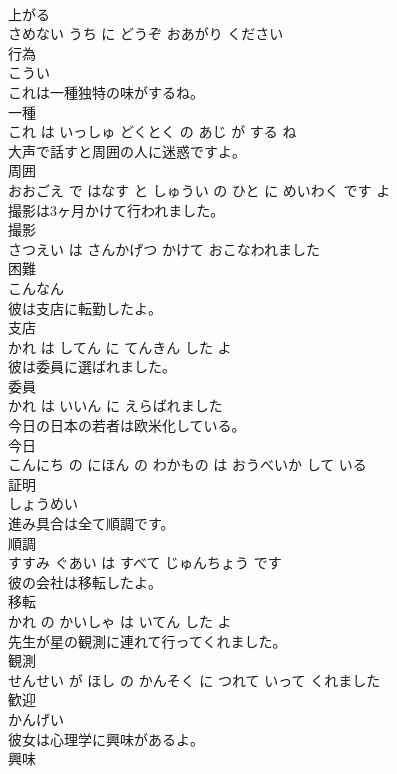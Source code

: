 \documentclass[8pt]{extreport}
\begin{document}
\begin{CJK}{UTF8}{min}
\\	上がる 
\\	さめない うち に どうぞ おあがり ください			
\\	行為	
\\	こうい			
\\	これは一種独特の味がするね。	
\\	一種 
\\	これ は いっしゅ どくとく の あじ が する ね			
\\	大声で話すと周囲の人に迷惑ですよ。	
\\	周囲 
\\	おおごえ で はなす と しゅうい の ひと に めいわく です よ			
\\	撮影は3ヶ月かけて行われました。	
\\	撮影 
\\	さつえい は さんかげつ かけて おこなわれました			
\\	困難	
\\	こんなん			
\\	彼は支店に転勤したよ。	
\\	支店 
\\	かれ は してん に てんきん した よ			
\\	彼は委員に選ばれました。	
\\	委員 
\\	かれ は いいん に えらばれました			
\\	今日の日本の若者は欧米化している。	
\\	今日 
\\	こんにち の にほん の わかもの は おうべいか して いる			
\\	証明	
\\	しょうめい			
\\	進み具合は全て順調です。	
\\	順調 
\\	すすみ ぐあい は すべて じゅんちょう です			
\\	彼の会社は移転したよ。	
\\	移転 
\\	かれ の かいしゃ は いてん した よ			
\\	先生が星の観測に連れて行ってくれました。	
\\	観測 
\\	せんせい が ほし の かんそく に つれて いって くれました			
\\	歓迎	
\\	かんげい			
\\	彼女は心理学に興味があるよ。	
\\	興味 

\end{CJK}
\end{document}
